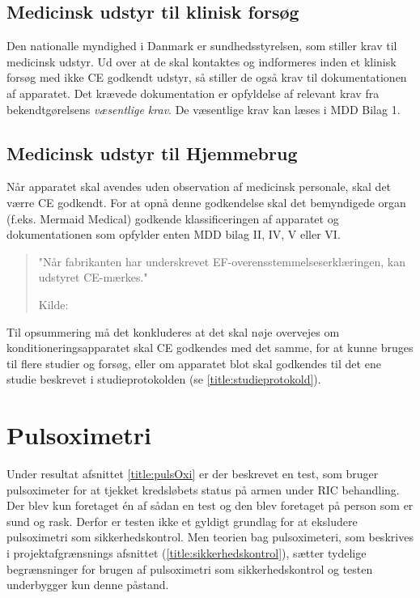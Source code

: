 \subsection{Medicinsk udstyr til klinisk forsøg}
Den nationalle myndighed i Danmark er sundhedsstyrelsen, som stiller krav til medicinsk udstyr. Ud over at de skal kontaktes og indformeres inden et klinisk forsøg med ikke CE godkendt udstyr, så stiller de også krav til dokumentationen af apparatet. Det krævede dokumentation er opfyldelse af relevant krav fra bekendtgørelsens \textit{væsentlige krav}. De væsentlige krav kan læses i MDD Bilag 1.

\subsection{Medicinsk udstyr til Hjemmebrug}
Når apparatet skal avendes uden observation af medicinsk personale, skal det værre CE godkendt. For at opnå denne godkendelse skal det bemyndigede organ (f.eks. Mermaid Medical) godkende klassificeringen af apparatet og dokumentationen som opfylder enten MDD bilag II, IV, V eller VI. 

\begin{quote}
	"Når fabrikanten har underskrevet EF-overensstemmelseserklæringen, kan udstyret CE-mærkes."
	
	Kilde: 
\end{quote}

Til opsummering må det konkluderes at det skal nøje overvejes om konditioneringsapparatet skal CE godkendes med det samme, for at kunne bruges til flere studier og forsøg, eller om apparatet blot skal godkendes til det ene studie beskrevet i studieprotokolden (se \ref{title:studieprotokold}).



\section{Pulsoximetri}
Under resultat afsnittet \ref{title:pulsOxi} er der beskrevet en test, som bruger pulsoximeter for at tjekket kredsløbets status på armen under RIC behandling. Der blev kun foretaget én af sådan en test og den blev foretaget på person som er sund og rask. Derfor er testen ikke et gyldigt grundlag for at eksludere pulsoximetri som sikkerhedskontrol. Men teorien bag pulsoximeteri, som beskrives i projektafgrænsnings afsnittet (\ref{title:sikkerhedskontrol}), sætter tydelige begrænsninger for brugen af pulsoximetri som sikkerhedskontrol og testen underbygger kun denne påstand. 



